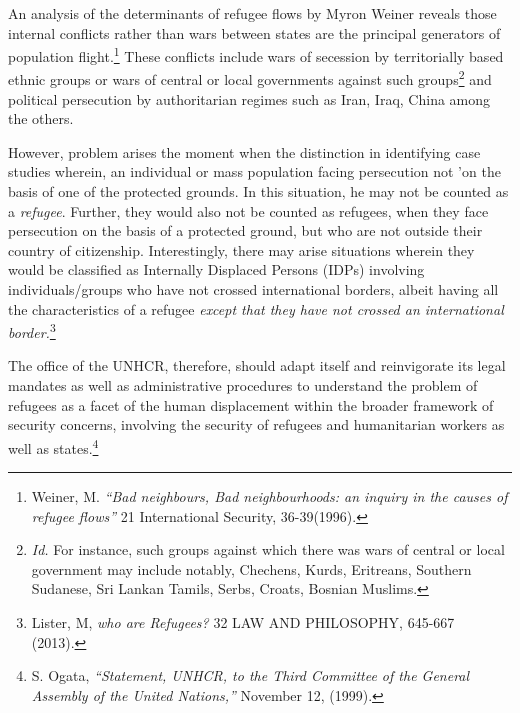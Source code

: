 \begin{multicols}{2}
\noi
An analysis of the determinants of refugee flows by Myron Weiner reveals those internal
conflicts rather than wars between states are the principal generators of population
flight.\footnote{Weiner, M. \textit{“Bad neighbours, Bad neighbourhoods: an inquiry in the causes of refugee flows”} 21
International Security, 36-39(1996).} These conflicts include wars of secession by territorially based ethnic groups or wars
of central or local governments against such groups\footnote{\textit{Id.} For instance, such groups against which there was wars of central or local government may include notably, Chechens, Kurds, Eritreans, Southern Sudanese, Sri Lankan Tamils, Serbs, Croats, Bosnian Muslims. } and political persecution by authoritarian regimes such as Iran, Iraq, China among the others.

\noi
However, problem arises the moment when the distinction in identifying case studies wherein,
an individual or mass population facing persecution not 'on the basis of one of the protected
grounds. In this situation, he may not be counted as a \textit{refugee}. Further, they would also not be
counted as refugees, when they face persecution on the basis of a protected ground, but who
are not outside their country of citizenship. Interestingly, there may arise situations wherein
they would be classified as Internally Displaced Persons (IDPs) involving individuals/groups
who have not crossed international borders, albeit having all the characteristics of a refugee
\textit{except that they have not crossed an international border.}\footnote{Lister, M, \textit{who are Refugees?} 32 LAW AND PHILOSOPHY, 645-667 (2013).}

\noi
The office of the UNHCR, therefore, should adapt itself and reinvigorate its legal mandates as
well as administrative procedures to understand the problem of refugees as a facet of the
human displacement within the broader framework of security concerns, involving the
security of refugees and humanitarian workers as well as states.\footnote{S. Ogata, \textit{“Statement, UNHCR, to the Third Committee of the General Assembly of the United Nations,”} November 12, (1999).}

\vspace{-.15cm}


\vspace{-.1cm}


\end{multicols}
